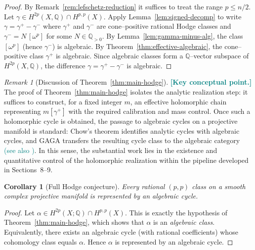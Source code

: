 \documentclass[11pt]{article}
\newcommand{\REVMZ}[1]{\textcolor{teal}{#1}}  %
\numberwithin{equation}{section}  %
\theoremstyle{plain}
\newtheorem{corollary}[theorem]{Corollary}
\theoremstyle{definition}
\theoremstyle{remark}
\newtheorem{remark}[theorem]{Remark}
\newcommand{\Q}{\mathbb{Q}}
\begin{document}
\begin{proof}

By Remark~\ref{rem:lefschetz-reduction} it suffices to treat the range $p\le n/2$.
Let $\gamma\in H^{2p}(X,\Q)\cap H^{p,p}(X)$.
Apply Lemma~\ref{lem:signed-decomp} to write
$\gamma=\gamma^{+}-\gamma^{-}$ where $\gamma^{+}$ and $\gamma^{-}$ are cone--positive
rational Hodge classes and $\gamma^{-}=N\,[\omega^{p}]$ for some $N\in\Q_{>0}$.
By Lemma~\ref{lem:gamma-minus-alg}, the class $[\omega^{p}]$ (hence $\gamma^{-}$) is algebraic.
By Theorem~\ref{thm:effective-algebraic}, the cone--positive class $\gamma^{+}$ is algebraic.
Since algebraic classes form a $\Q$--vector subspace of $H^{2p}(X,\Q)$, the difference
$\gamma=\gamma^{+}-\gamma^{-}$ is algebraic.

\end{proof}
\begin{remark}[Discussion of Theorem~\ref{thm:main-hodge}]\label{rem:main-hodge-discussion}
\REVMZ{\textbf{[Key conceptual point.]}}
The proof of Theorem~\ref{thm:main-hodge} isolates the analytic realization step: it suffices to construct,
for a fixed integer $m$, an effective holomorphic chain representing $m[\gamma^{+}]$ with the required calibration and mass
control.  Once such a holomorphic cycle is obtained, the passage to algebraic cycles on a projective manifold is standard:
Chow's theorem \REVMZ{\cite{Chow49}} identifies analytic cycles with algebraic cycles, and GAGA \REVMZ{\cite{Serre56}} transfers the resulting cycle class
to the algebraic category \REVMZ{(see also \cite{GH78,Hartshorne77})}.
In this sense, the substantial work lies in the existence and quantitative control of the holomorphic realization
within the pipeline developed in Sections~8--9.
\end{remark}






\begin{corollary}[Full Hodge conjecture]\label{cor:full-hodge}
	Every rational $(p,p)$ class on a smooth complex projective manifold is represented
	by an algebraic cycle.
\end{corollary}

\begin{proof}
Let $\alpha\in H^{2p}(X;\Q)\cap H^{p,p}(X)$.  This is exactly the hypothesis of Theorem~\ref{thm:main-hodge}, which shows that
$\alpha$ is an \emph{algebraic class}.  Equivalently, there exists an algebraic cycle (with rational coefficients) whose cohomology
class equals $\alpha$.  Hence $\alpha$ is represented by an algebraic cycle.

\end{proof}
\end{document}
